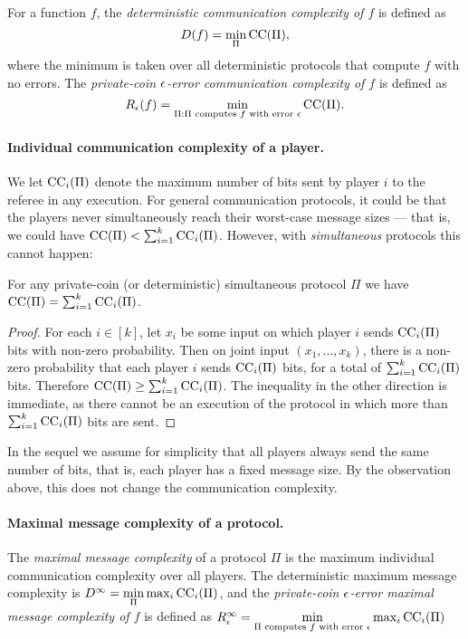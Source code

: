 For a function $f$, the \emph{deterministic communication complexity of $f$} is defined as
\begin{equation*}
	D(f) = \min_{\Pi} \mathrm{CC}(\Pi),
\end{equation*}
where the minimum is taken over all deterministic protocols that compute $f$ with no errors. The \emph{private-coin $\epsilon$-error communication complexity of $f$} is defined as
\begin{equation*}
	R_\epsilon(f) = \min_{\Pi : \text{$\Pi$ computes $f$ with error $\epsilon$}} \mathrm{CC}(\Pi).
\end{equation*}

\paragraph{Individual communication complexity of a player.}
We let $\mathrm{CC}_i(\Pi)$ denote the maximum number of bits sent by player $i$ to the referee in any execution.
For general communication protocols, it could be that the players never simultaneously reach their worst-case message sizes --- that is,
we could have $\mathrm{CC}(\Pi) < \sum_{i=1}^k \mathrm{CC}_i(\Pi)$.
However, with \emph{simultaneous} protocols this cannot happen:
\begin{observation}
	For any private-coin (or deterministic) simultaneous protocol $\Pi$ we have $\mathrm{CC}(\Pi) = \sum_{i=1}^k \mathrm{CC}_i(\Pi)$.
	\label{obs:sum}
\end{observation}
\begin{proof}
	For each $i \in [k]$, let $x_i$ be some input on which player $i$ sends $\mathrm{CC}_i(\Pi)$ bits with non-zero probability.
	Then on joint input $(x_1,\ldots,x_k)$, there is a non-zero probability that
each player $i$ sends $\mathrm{CC}_i(\Pi)$ bits, for a total of $\sum_{i=1}^k \mathrm{CC}_i(\Pi)$ bits.
Therefore $\mathrm{CC}(\Pi) \geq \sum_{i=1}^k \mathrm{CC}_i(\Pi)$. The inequality in the other direction is immediate, as there cannot be an execution of the protocol in which more than $\sum_{i=1}^k \mathrm{CC}_i(\Pi)$ bits are sent.
\end{proof}

In the sequel we assume for simplicity that all players always send the same number of bits, that is, each player has a fixed message size. By the observation above, this does not change the communication complexity.

\paragraph{Maximal message complexity of a protocol.}
The \emph{maximal message complexity} of a protocol $\Pi$ is the maximum individual communication complexity over all players. The deterministic maximum message complexity is $D^{\infty} = \min\limits_{\Pi} \max_i\mathrm{CC}_i(\Pi)$, and the \emph{private-coin $\epsilon$-error maximal message complexity of $f$} is defined as $R^{\infty}_\epsilon = \min\limits_{\text{$\Pi$ computes $f$ with error $\epsilon$}} \max_i\mathrm{CC}_i(\Pi)$

